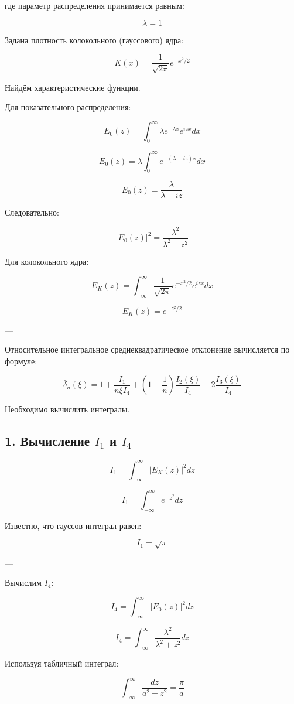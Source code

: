 \documentclass[12pt,a4paper]{article}
\begin{document}
где параметр распределения принимается равным:

\[
\lambda = 1
\]

Задана плотность колокольного (гауссового) ядра:

\[
K(x)=\frac{1}{\sqrt{2\pi}}e^{-x^2/2}
\]

Найдём характеристические функции.

Для показательного распределения:

\[
E_0(z)=\int_0^\infty \lambda e^{-\lambda x}e^{izx}dx
\]

\[
E_0(z)=\lambda \int_0^\infty e^{-(\lambda-iz)x}dx
\]

\[
E_0(z)=\frac{\lambda}{\lambda-iz}
\]

Следовательно:

\[
|E_0(z)|^2=
\frac{\lambda^2}{\lambda^2+z^2}
\]

Для колокольного ядра:

\[
E_K(z)=\int_{-\infty}^{\infty}
\frac{1}{\sqrt{2\pi}}e^{-x^2/2}e^{izx}dx
\]

\[
E_K(z)=e^{-z^2/2}
\]

---

Относительное интегральное среднеквадратическое отклонение вычисляется по формуле:

\[
\bar{\delta}_n(\xi)=
1+\frac{I_1}{n\xi I_4}
+\left(1-\frac1n\right)\frac{I_2(\xi)}{I_4}
-2\frac{I_3(\xi)}{I_4}
\]

Необходимо вычислить интегралы.


\subsection*{1. Вычисление $I_1$ и $I_4$}

\[
I_1=
\int_{-\infty}^{\infty}|E_K(z)|^2dz
\]

\[
I_1=
\int_{-\infty}^{\infty}e^{-z^2}dz
\]

Известно, что гауссов интеграл равен:

\[
I_1=\sqrt{\pi}
\]

---

Вычислим $I_4$:

\[
I_4=
\int_{-\infty}^{\infty}|E_0(z)|^2dz
\]

\[
I_4=
\int_{-\infty}^{\infty}
\frac{\lambda^2}{\lambda^2+z^2}dz
\]

Используя табличный интеграл:

\[
\int_{-\infty}^{\infty}\frac{dz}{a^2+z^2}=\frac{\pi}{a}
\]
\end{document}

